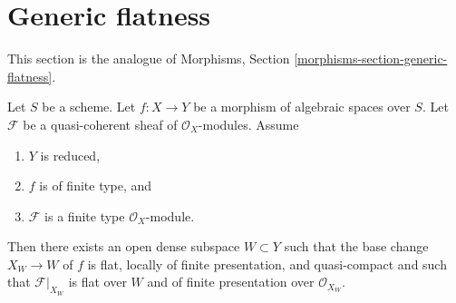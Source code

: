 \section{Generic flatness}
\label{section-generic-flatness}

\noindent
This section is the analogue of
Morphisms, Section \ref{morphisms-section-generic-flatness}.

\begin{proposition}
\label{proposition-generic-flatness-reduced}
Let $S$ be a scheme.
Let $f : X \to Y$ be a morphism of algebraic spaces over $S$.
Let $\mathcal{F}$ be a quasi-coherent sheaf of $\mathcal{O}_X$-modules.
Assume
\begin{enumerate}
\item $Y$ is reduced,
\item $f$ is of finite type, and
\item $\mathcal{F}$ is a finite type $\mathcal{O}_X$-module.
\end{enumerate}
Then there exists an open dense subspace $W \subset Y$ such that
the base change $X_W \to W$ of $f$ is flat, locally of finite presentation, and
quasi-compact and such that $\mathcal{F}|_{X_W}$ is flat over $W$ and of
finite presentation over $\mathcal{O}_{X_W}$.
\end{proposition}


